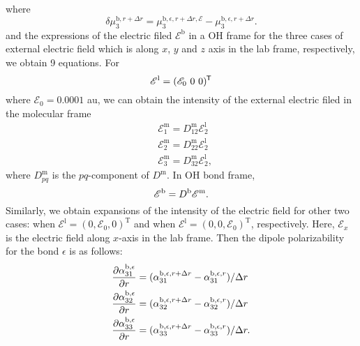 %
where
\begin{equation}
  \delta \mu^{{\text{b}},r+\Delta r}_{3} = \mu^{{\text{b}},\epsilon,r+\Delta r,\mathscr{E}}_{3} - \mu^{{\text{b}},\epsilon,r+\Delta r}_{3}.
\end{equation}
%
and the expressions of the electric filed ${\mathscr{E}^\text{b}}$ in a OH frame for the three cases of external electric field 
which is along $x$, $y$ and $z$ axis in the lab frame, respectively, we obtain 9 equations.
%
For
\begin{equation}
  {\bf\mathscr{E}}^{\text{l}} = (\mathscr{E}_0 \  0 \  0){^{\mkern-1.5mu\mathsf{T}}} \nonumber
\end{equation}  
where $\mathscr{E}_0 = 0.0001$ au, we can obtain the intensity of the external electric filed in the molecular frame  
\begin{subequations}
  \begin{align}
    &\mathscr{E}^\text{m}_1 = {D}^{\text{m}}_{12} \mathscr{E}^\text{l}_2\\
    &\mathscr{E}^\text{m}_2 = {D}^{\text{m}}_{22} \mathscr{E}^\text{l}_2\\
    &\mathscr{E}^\text{m}_3 = {D}^{\text{m}}_{32} \mathscr{E}^\text{l}_2,
    \end{align}
\end{subequations}
where ${D}^{\text{m}}_{pq}$ is the $pq$-component of ${D}^\text{m}$.
%
In OH bond frame,  
\begin{equation}
  \mathscr{E}^{\text b} = {D}^{\text b} \mathscr{E}^{\text{m}}.
\end{equation}
Similarly, we obtain expansions of the intensity of the electric field for other two cases: 
when $\mathscr{E}^{\text{l}} = (0,\mathscr{E}_0, 0)^\text{T}$ and when $\mathscr{E}^{\text{l}} = (0,0,\mathscr{E}_0)^\text{T}$, respectively.
Here, $\mathscr{E}_x$ is the electric field along $x$-axis in the lab frame. 
    Then the dipole polarizability for the bond ${\epsilon}$ is as follows:
\begin{subequations}
  \begin{align}
    &\frac{\partial \alpha^{{\text b},\epsilon}_{31}}{\partial r} = (\alpha^{{\text b},\epsilon,r+\Delta r}_{31} -\alpha^{{\text b},\epsilon,r}_{31})/\Delta r\\
    &\frac{\partial \alpha^{{\text b},\epsilon}_{32}}{\partial r} = (\alpha^{{\text b},\epsilon,r+\Delta r}_{32} -\alpha^{{\text b},\epsilon,r}_{32})/\Delta r\\
    &\frac{\partial \alpha^{{\text b},\epsilon}_{33}}{\partial r} = (\alpha^{{\text b},\epsilon,r+\Delta r}_{33} -\alpha^{{\text b},\epsilon,r}_{33})/\Delta r.
  \end{align}
\end{subequations}
